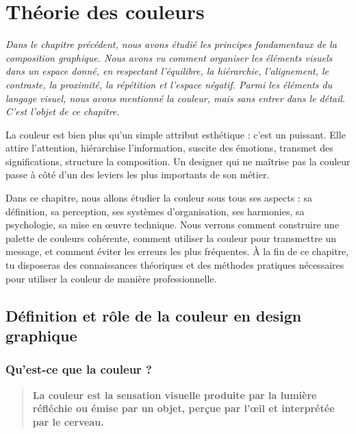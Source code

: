 \chapter{Théorie des couleurs}

\noindent
\textit{Dans le chapitre précédent, nous avons étudié les principes fondamentaux de la composition graphique. Nous avons vu comment organiser les éléments visuels dans un espace donné, en respectant l'équilibre, la hiérarchie, l'alignement, le contraste, la proximité, la répétition et l'espace négatif. Parmi les éléments du langage visuel, nous avons mentionné la couleur, mais sans entrer dans le détail. C'est l'objet de ce chapitre.}

\vspace{1em}

\noindent
La couleur est bien plus qu'un simple attribut esthétique : c'est un  puissant. Elle attire l'attention, hiérarchise l'information, suscite des émotions, transmet des significations, structure la composition. Un designer qui ne maîtrise pas la couleur passe à côté d'un des leviers les plus importants de son métier.

\vspace{1em}

\noindent
Dans ce chapitre, nous allons étudier la couleur sous tous ses aspects : sa définition, sa perception, ses systèmes d'organisation, ses harmonies, sa psychologie, sa mise en œuvre technique. Nous verrons comment construire une palette de couleurs cohérente, comment utiliser la couleur pour transmettre un message, et comment éviter les erreurs les plus fréquentes. À la fin de ce chapitre, tu disposeras des connaissances théoriques et des méthodes pratiques nécessaires pour utiliser la couleur de manière professionnelle.

\section{Définition et rôle de la couleur en design graphique}

\subsection{Qu'est-ce que la couleur ?}

\begin{quote}
\textbf{La couleur est la sensation visuelle produite par la lumière réfléchie ou émise par un objet, perçue par l'œil et interprétée par le cerveau.}
\end{quote}

